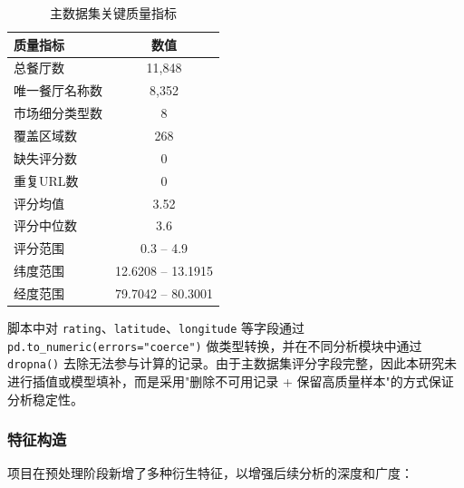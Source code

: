 \documentclass[11pt,a4paper]{article}
\begin{document}
\begin{table}[H]
\renewcommand{\arraystretch}{1.3}
\caption{主数据集关键质量指标}
\label{tab:quality}
\centering
\begin{tabular}{lc}
\toprule
\textbf{质量指标} & \textbf{数值} \\
\midrule
总餐厅数 & 11,848 \\
唯一餐厅名称数 & 8,352 \\
市场细分类型数 & 8 \\
覆盖区域数 & 268 \\
缺失评分数 & 0 \\
重复URL数 & 0 \\
评分均值 & 3.52 \\
评分中位数 & 3.6 \\
评分范围 & 0.3 -- 4.9 \\
纬度范围 & 12.6208 -- 13.1915 \\
经度范围 & 79.7042 -- 80.3001 \\
\bottomrule
\end{tabular}
\end{table}

脚本中对 \texttt{rating}、\texttt{latitude}、\texttt{longitude} 等字段通过 \texttt{pd.to\_numeric(errors="coerce")} 做类型转换，并在不同分析模块中通过 \texttt{dropna()} 去除无法参与计算的记录。由于主数据集评分字段完整，因此本研究未进行插值或模型填补，而是采用"删除不可用记录 + 保留高质量样本"的方式保证分析稳定性。

\subsubsection{特征构造}

项目在预处理阶段新增了多种衍生特征，以增强后续分析的深度和广度：
\end{document}
